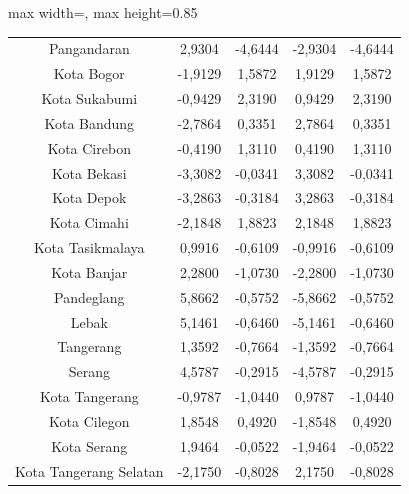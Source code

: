 \begin{table}[H]
\begin{adjustbox}{max width=\textwidth, max height=0.85\textheight}
\begin{tabular}{|c|c|c|c|c|}
Pangandaran & 2,9304 & -4,6444 & -2,9304 & -4,6444 \\
Kota Bogor & -1,9129 & 1,5872 & 1,9129 & 1,5872 \\
Kota Sukabumi & -0,9429 & 2,3190 & 0,9429 & 2,3190 \\
Kota Bandung & -2,7864 & 0,3351 & 2,7864 & 0,3351 \\
Kota Cirebon & -0,4190 & 1,3110 & 0,4190 & 1,3110 \\
Kota Bekasi & -3,3082 & -0,0341 & 3,3082 & -0,0341 \\
Kota Depok & -3,2863 & -0,3184 & 3,2863 & -0,3184 \\
Kota Cimahi & -2,1848 & 1,8823 & 2,1848 & 1,8823 \\
Kota Tasikmalaya & 0,9916 & -0,6109 & -0,9916 & -0,6109 \\
Kota Banjar & 2,2800 & -1,0730 & -2,2800 & -1,0730 \\
Pandeglang & 5,8662 & -0,5752 & -5,8662 & -0,5752 \\
Lebak & 5,1461 & -0,6460 & -5,1461 & -0,6460 \\
Tangerang & 1,3592 & -0,7664 & -1,3592 & -0,7664 \\
Serang & 4,5787 & -0,2915 & -4,5787 & -0,2915 \\
Kota Tangerang & -0,9787 & -1,0440 & 0,9787 & -1,0440 \\
Kota Cilegon & 1,8548 & 0,4920 & -1,8548 & 0,4920 \\
Kota Serang & 1,9464 & -0,0522 & -1,9464 & -0,0522 \\
Kota Tangerang Selatan & -2,1750 & -0,8028 & 2,1750 & -0,8028 \\
\hline
\end{tabular}
\end{adjustbox}
\end{table}